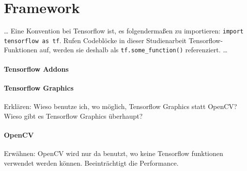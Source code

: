 \section{Framework}

\dots
Eine Konvention bei Tensorflow ist, es folgendermaßen zu importieren: \texttt{import tensorflow as tf}. Rufen Codeblöcke in dieser Studienarbeit Tensorflow-Funktionen auf, werden sie deshalb als \texttt{tf.some_function()} referenziert.
\dots

\paragraph{Tensorflow Addons}
\paragraph{Tensorflow Graphics}
Erklären: Wieso benutze ich, wo möglich, Tensorflow Graphics statt OpenCV? Wieso gibt es Tensorflow Graphics überhaupt?
\paragraph{OpenCV}
Erwähnen: OpenCV wird nur da benutzt, wo keine Tensorflow funktionen verwendet werden können. Beeinträchtigt die Performance.